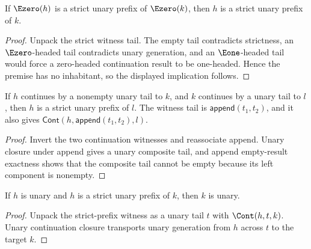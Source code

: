 \begin{theorem}
\label{thm:nat-unary-strict-prefix-e0-inversion}
If \(\Ezero(h)\) is a strict unary prefix of \(\Ezero(k)\), then \(h\) is a strict unary prefix of \(k\).
\end{theorem}
\begin{proof}
Unpack the strict witness tail. The empty tail contradicts strictness, an
\(\Ezero\)-headed tail contradicts unary generation, and an \(\Eone\)-headed
tail would force a zero-headed continuation result to be one-headed. Hence the
premise has no inhabitant, so the displayed implication follows.
\end{proof}

\begin{theorem}
\label{thm:nat-unary-strict-prefix-append-tail-trans}
If \(h\) continues by a nonempty unary tail to \(k\), and \(k\) continues by a
unary tail to \(l\), then \(h\) is a strict unary prefix of \(l\). The witness
tail is \(\mathsf{append}(t_1,t_2)\), and it also gives
\(\mathsf{Cont}(h,\mathsf{append}(t_1,t_2),l)\).
\end{theorem}
\begin{proof}
Invert the two continuation witnesses and reassociate append. Unary closure
under append gives a unary composite tail, and append empty-result exactness
shows that the composite tail cannot be empty because its left component is
nonempty.
\end{proof}

\begin{lemma}
\label{lem:nat-unary-strict-prefix-target-unary}
If \(h\) is unary and \(h\) is a strict unary prefix of \(k\), then \(k\) is unary.
\end{lemma}
\begin{proof}
Unpack the strict-prefix witness as a unary tail \(t\) with \(\Cont(h,t,k)\).
Unary continuation closure transports unary generation from \(h\) across \(t\)
to the target \(k\).
\end{proof}

